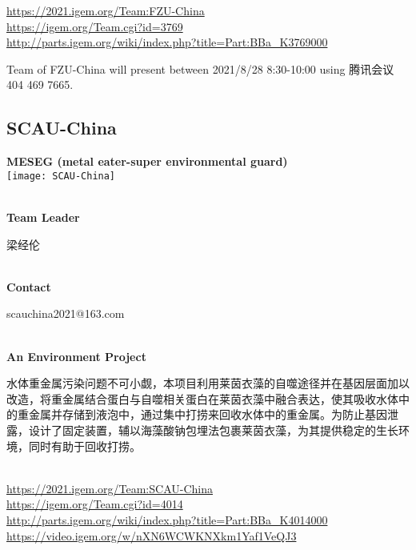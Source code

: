 \url{https://2021.igem.org/Team:FZU-China }\\
\url{https://igem.org/Team.cgi?id=3769 }\\
\url{http://parts.igem.org/wiki/index.php?title=Part:BBa_K3769000 }\\


\vfill{}









Team of FZU-China will present between    2021/8/28 8:30-10:00     using 腾讯会议 404 469 7665.
\newpage


\subsection{\textcolor{Blu}{ SCAU-China } }
\vspace{5mm}
\begin{center}
\large{
  \textbf{ MESEG (metal eater-super environmental guard) }\\
  \texttt{[image: SCAU-China]}
}
\end{center}
\textbf{\\Team Leader}

  梁经伦


\textbf{\\Contact}

  scauchina2021@163.com

\textbf{\\An Environment Project\\}\begin{spacing}{1.5}

水体重金属污染问题不可小觑，本项目利用莱茵衣藻的自噬途径并在基因层面加以改造，将重金属结合蛋白与自噬相关蛋白在莱茵衣藻中融合表达，使其吸收水体中的重金属并存储到液泡中，通过集中打捞来回收水体中的重金属。为防止基因泄露，设计了固定装置，辅以海藻酸钠包埋法包裹莱茵衣藻，为其提供稳定的生长环境，同时有助于回收打捞。\end{spacing}
\\

\url{https://2021.igem.org/Team:SCAU-China }\\
\url{https://igem.org/Team.cgi?id=4014 }\\
\url{http://parts.igem.org/wiki/index.php?title=Part:BBa_K4014000 }\\
\url{https://video.igem.org/w/nXN6WCWKNXkm1Yaf1VeQJ3 }\\

